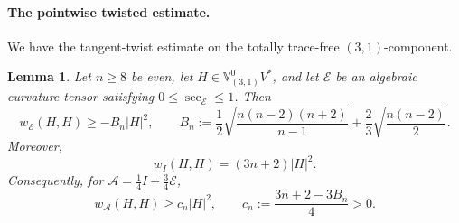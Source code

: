 \documentclass[reqno,11pt]{amsart}
\newtheorem{lemma}[theorem]{Lemma}
\theoremstyle{definition}
\newcommand{\cA}{\mathcal A}
\newcommand{\cE}{\mathcal E}
\begin{document}
\paragraph{The pointwise twisted estimate.}
We have the tangent-twist estimate on the totally trace-free $(3,1)$-component.
\begin{lemma}\label{lem:tracefree-hook-twist-estimate}
Let $n\geq8$ be even, let $H\in\mathbb V^0_{(3,1)}V^*$, and let $\cE$ be an
algebraic curvature tensor satisfying $0\leq\sec_{\cE}\leq1$.  Then
\begin{equation}\label{eq:tracefree-hook-twist-bound}
  w_{\cE}(H,H)\geq-B_n|H|^2,
  \qquad
  B_n:=\frac12\sqrt{\frac{n(n-2)(n+2)}{n-1}}
       +\frac23\sqrt{\frac{n(n-2)}2}.
\end{equation}
Moreover,
\begin{equation}\label{eq:wI-tracefree-hook}
  w_I(H,H)=(3n+2)|H|^2.
\end{equation}
Consequently, for $\cA=\frac14I+\frac34\cE$,
\begin{equation}\label{eq:tracefree-hook-twist-positive}
  w_{\cA}(H,H)\geq c_n|H|^2,
  \qquad
  c_n:=\frac{3n+2-3B_n}{4}>0.
\end{equation}
\end{lemma}
\end{document}
